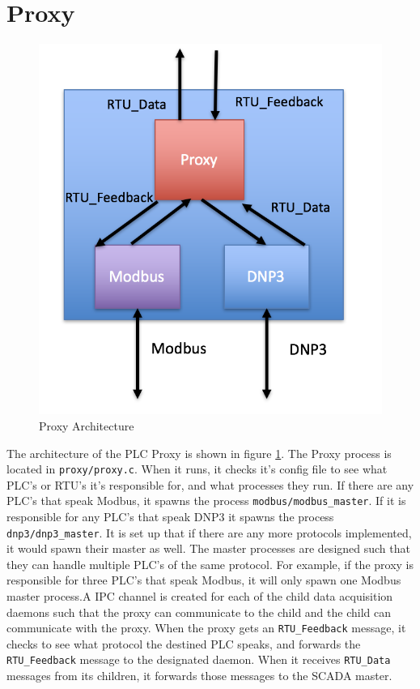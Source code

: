 \documentclass[11pt,a4paper,oldfontcommands]{memoir}
\def\code#1{\texttt{#1}}
\begin{document}
\section{Proxy}
\begin{figure}[ht]
  \begin{center}
  \includegraphics{proxy}
  \caption{Proxy Architecture}
  \label{fig:4}
  \end{center}
\end{figure}

\indent \indent
The architecture of the PLC Proxy is shown in figure \ref{fig:4}. The Proxy
process is located in \code{proxy/proxy.c}. When it runs, it checks it's config
file to see what PLC's or RTU's it's responsible for, and what processes they run.
If there are any PLC's that speak Modbus, it spawns the process 
\code{modbus/modbus\_master}. If it is responsible for any PLC's that speak DNP3 it spawns
the process \code{dnp3/dnp3\_master}. It is set up that if there are any more protocols
implemented, it would spawn their master as well. The master processes are designed
such that they can handle multiple PLC's of the same protocol. For example, if the
proxy is responsible for three PLC's that speak Modbus, it will only spawn one Modbus
 master process.A IPC channel is created for each of the 
child data acquisition daemons such that the proxy can communicate to the child and the
child can communicate with the proxy. When the proxy gets an \code{RTU\_Feedback} message,
it checks to see what protocol the destined PLC speaks, and forwards the 
\code{RTU\_Feedback} message to the designated daemon. When it receives \code{RTU\_Data}
messages from its children, it forwards those messages to the SCADA master. \\
\end{document}
